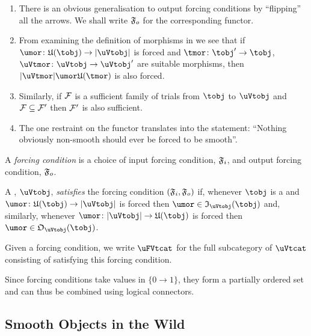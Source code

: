 \documentclass[%
12pt,%
arxiv,%
defaults
]{myclass}
\begin{document}
\begin{remark}
\begin{enumerate}
\item There is an obvious generalisation to output forcing conditions by ``flipping'' all the arrows.
We shall write \(\oforce\) for the corresponding functor.

\item From examining the definition of morphisms in \rcat we see that if \(\umor \colon \ufunc(\tobj) \to \abs{\uVtobj}\) is forced and \(\tmor \colon \tobj' \to \tobj\), \(\uVtmor \colon \uVtobj \to \uVtobj'\) are suitable morphisms, then \(\abs{\uVtmor} \umor \ufunc(\tmor)\) is also forced.

\item Similarly, if \(\mathcal{F}\) is a sufficient family of trials from \(\tobj\) to \(\uVtobj\) and \(\mathcal{F} \subseteq \mathcal{F}'\) then \(\mathcal{F}'\) is also sufficient.

\item The one restraint on the functor translates into the statement: ``Nothing obviously non\hyp{}smooth should ever be forced to be smooth''.
\end{enumerate}
\end{remark}

\begin{defn}
A \emph{forcing condition} is a choice of input forcing condition, \(\iforce\), and output forcing condition, \(\oforce\).

A \uVtobj, \(\uVtobj\), \emph{satisfies} the forcing condition \((\iforce, \oforce)\) if, whenever \(\tobj\) is a \tobj and \(\umor \colon \ufunc(\tobj) \to \abs{\uVtobj}\) is forced then \(\umor \in \itest_{\uVtobj}(\tobj)\) and, similarly, whenever \(\umor \colon \abs{\uVtobj} \to \ufunc(\tobj)\) is forced then \(\umor \in \otest_{\uVtobj}(\tobj)\).

Given a forcing condition, we write \(\uFVtcat\) for the full subcategory of \(\uVtcat\) consisting of \uVtobjs satisfying this forcing condition.
\end{defn}

Since forcing conditions take values in \(\{0 \to 1\}\), they form a partially ordered set and can thus be combined using logical connectors.


\subsection{Smooth Objects in the Wild}
\label{sec:smthwild}
\end{document}
